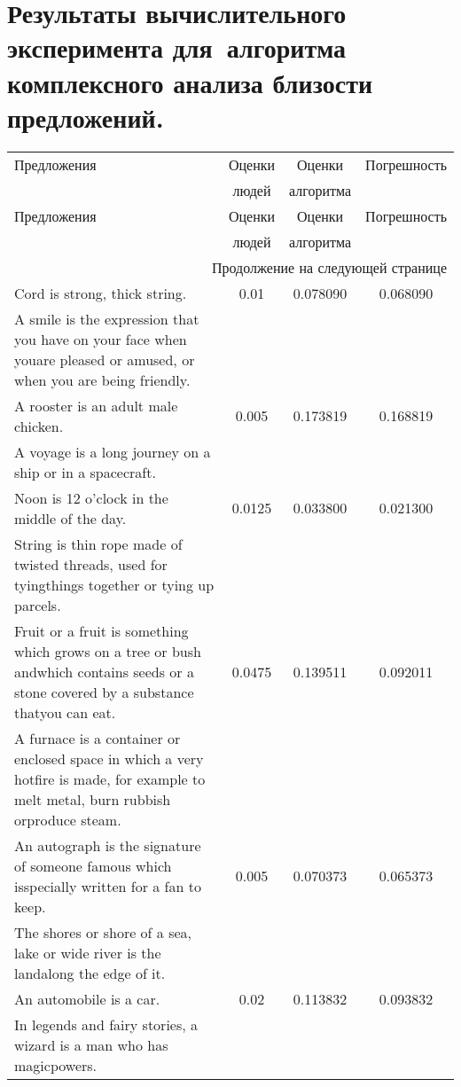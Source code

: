 \appendix


\section{Результаты вычислительного эксперимента для~алгоритма комплексного анализа близости предложений.}
\label{app:sentence_similarity_table}


\begin{center}
{\Large
\begin{longtable}{|p{9cm}|c|c|c|}
\hline
Предложения & Оценки & Оценки & Погрешность  \\
 & людей & алгоритма &  \\
\hline\endfirsthead
\hline
Предложения & Оценки & Оценки & Погрешность  \\
 & людей & алгоритма &  \\
\hline\endhead
\hline \multicolumn{4}{|r|}{{Продолжение на следующей странице}} \\ \hline
\endfoot
\endlastfoot
Cord is strong, thick string. & 0.01 & 0.078090 & 0.068090 \\
A smile is the expression that you have on your face when youare pleased or amused, or when you are being friendly. & & & \\
\hline
A rooster is an adult male chicken. & 0.005 & 0.173819 & 0.168819 \\
A voyage is a long journey on a ship or in a spacecraft. & & & \\
\hline
Noon is 12 o'clock in the middle of the day. & 0.0125 & 0.033800 & 0.021300 \\
String is thin rope made of twisted threads, used for tyingthings together or tying up parcels. & & & \\
\hline
Fruit or a fruit is something which grows on a tree or bush andwhich contains seeds or a stone covered by a substance thatyou can eat. & 0.0475 & 0.139511 & 0.092011 \\
A furnace is a container or enclosed space in which a very hotfire is made, for example to melt metal, burn rubbish orproduce steam. & & & \\
\hline
An autograph is the signature of someone famous which isspecially written for a fan to keep. & 0.005 & 0.070373 & 0.065373 \\
The shores or shore of a sea, lake or wide river is the landalong the edge of it. & & & \\
\hline
An automobile is a car. & 0.02 & 0.113832 & 0.093832 \\
In legends and fairy stories, a wizard is a man who has magicpowers. & & & \\

\end{longtable}}
\end{center}

